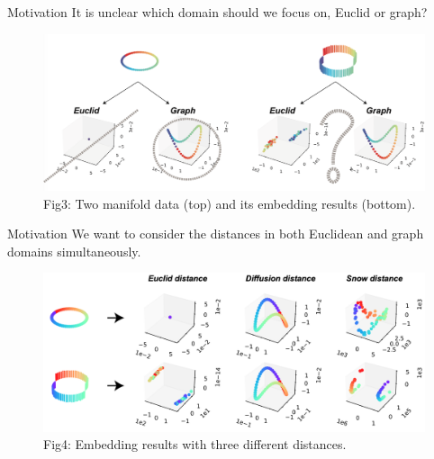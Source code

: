 \documentclass[
  ignorenonframetext,
]{beamer}
\begin{document}
\begin{frame}{Motivation}
\label{motivation-3}
It is unclear which domain should we focus on, Euclid or graph?

\begin{figure}[H]

{\centering \includegraphics{Beamer_files/figure-beamer/792814a4-a462-4db9-accb-0adf18a1a0ce-1-20b92b21-f221-425c-83ca-7818c930841d.png}

}

\caption{Fig3: Two manifold data (top) and its embedding results
(bottom).}

\end{figure}%
\end{frame}

\begin{frame}{Motivation}
\label{motivation-4}
We want to consider the distances in both Euclidean and graph domains
simultaneously.

\begin{figure}[H]

{\centering \includegraphics{Beamer_files/figure-beamer/d15df95f-ad86-4918-a938-24306749f03b-1-b961e7a3-ebb7-4ab0-95b6-84b604d7e9bc.png}

}

\caption{Fig4: Embedding results with three different distances.}

\end{figure}%
\end{frame}
\end{document}
